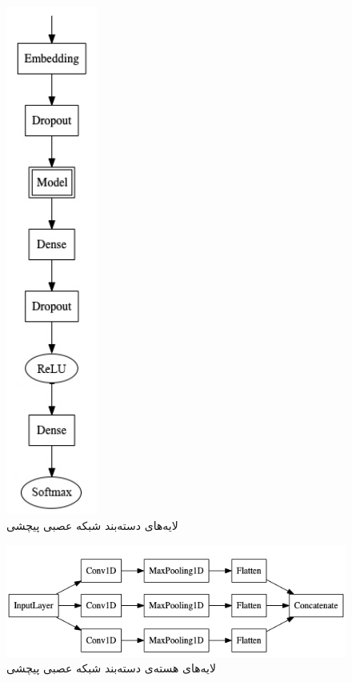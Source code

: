 \begin{figure}
	\centering
	\includegraphics[width=3cm]{figures/cnn/cnn-model.jpg}
	\caption[لایه‌های دسته‌بند شبکه عصبی پیچشی]{لایه‌های دسته‌بند شبکه عصبی پیچشی}
	\label{fig:cnn-model}
\end{figure}

\begin{figure}
	\centering
	\includegraphics[width=15cm]{figures/cnn/cnn-model-core.jpg}
		\caption[لایه‌های هسته‌ی دسته‌بند شبکه عصبی پیچشی]{لایه‌های هسته‌ی دسته‌بند شبکه عصبی پیچشی}
	\label{fig:cnn-model-core}
\end{figure}

